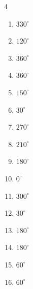 \begin{multicols}{4}
\begin{enumerate}
  \item $\displaystyle 330^{\circ}$

  \item $\displaystyle 120^{\circ}$

  \item $\displaystyle 360^{\circ}$
        \phantom{$\displaystyle =2\pi$}

  \item $\displaystyle 360^{\circ}$
        \phantom{$\displaystyle =2\pi$}

  \item $\displaystyle 150^{\circ}$

  \item $\displaystyle 30^{\circ}$

  \item $\displaystyle 270^{\circ}$

  \item $\displaystyle 210^{\circ}$

  \item $\displaystyle 180^{\circ}$
        \phantom{$\displaystyle =\pi$}

  \item $\displaystyle 0^{\circ}$
        \phantom{$\displaystyle =0$}

  \item $\displaystyle 300^{\circ}$

  \item $\displaystyle 30^{\circ}$

  \item $\displaystyle 180^{\circ}$
        \phantom{$\displaystyle =\pi$}

  \item $\displaystyle 180^{\circ}$
        \phantom{$\displaystyle =\pi$}

  \item $\displaystyle 60^{\circ}$

  \item $\displaystyle 60^{\circ}$

\columnbreak %


\end{enumerate}
\end{multicols}
